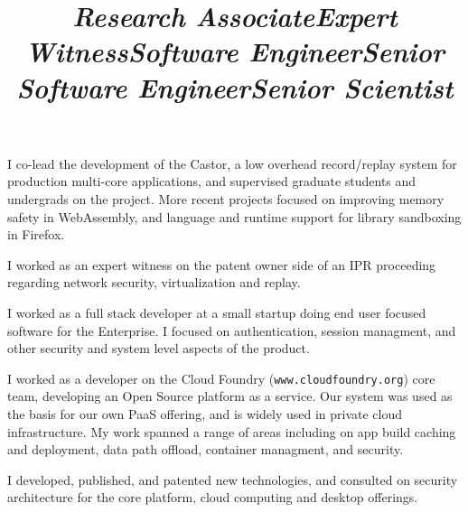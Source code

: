 \begin{resume}
\title{\em Research Associate}
\begin{position} I co-lead the development of the Castor, a low overhead
record/replay system for production multi-core applications, and supervised
graduate students and undergrads on the project. More recent projects
focused on improving memory safety in WebAssembly, and language and runtime
support for library sandboxing in Firefox.

\end{position}

\title{\em Expert Witness}

\begin{position}
I worked as an expert witness on the patent owner side of an IPR proceeding
regarding network security, virtualization and replay.
\end{position}


\title{\em Software Engineer}

\begin{position}
I worked as a full stack developer at a small startup doing end user focused
software for the Enterprise. I focused on authentication, session managment,
and other security and system level aspects of the product.
\end{position}


\title{\em Senior Software Engineer}

\begin{position}
I worked as a developer on the Cloud Foundry ({\tt www.cloudfoundry.org}) core
team, developing an Open Source platform as a service. Our system was used
as the basis for our own PaaS offering, and is widely used in private cloud
infrastructure. My work spanned a range of areas including on app build caching
and deployment, data path offload, container managment, and security.

\end{position}


\title{\em Senior Scientist}

\begin{position}
I developed, published, and patented new technologies, and consulted on
security architecture for the core platform, cloud computing and desktop
offerings.


\end{position}
\end{resume}

